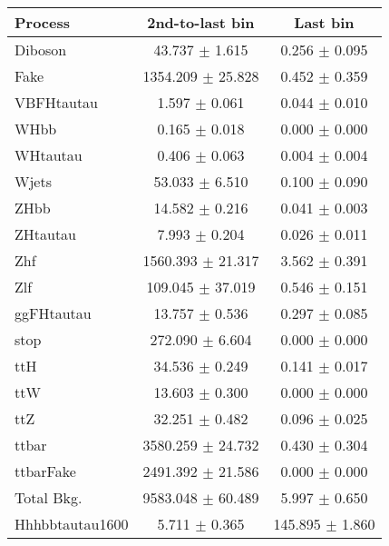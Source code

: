 \begin{tabular}{lcc}
  \toprule
  Process & 2nd-to-last bin & Last bin \\
  \midrule
  Diboson	& 43.737	$\pm$ 1.615	& 0.256	$\pm$ 0.095 \\
  Fake		& 1354.209	$\pm$ 25.828	& 0.452	$\pm$ 0.359 \\
  VBFHtautau	& 1.597	$\pm$ 0.061	& 0.044	$\pm$ 0.010 \\
  WHbb		& 0.165	$\pm$ 0.018	& 0.000	$\pm$ 0.000 \\
  WHtautau	& 0.406	$\pm$ 0.063	& 0.004	$\pm$ 0.004 \\
  Wjets		& 53.033	$\pm$ 6.510	& 0.100	$\pm$ 0.090 \\
  ZHbb		& 14.582	$\pm$ 0.216	& 0.041	$\pm$ 0.003 \\
  ZHtautau	& 7.993	$\pm$ 0.204	& 0.026	$\pm$ 0.011 \\
  Zhf		& 1560.393	$\pm$ 21.317	& 3.562	$\pm$ 0.391 \\
  Zlf		& 109.045	$\pm$ 37.019	& 0.546	$\pm$ 0.151 \\
  ggFHtautau	& 13.757	$\pm$ 0.536	& 0.297	$\pm$ 0.085 \\
  stop		& 272.090	$\pm$ 6.604	& 0.000	$\pm$ 0.000 \\
  ttH		& 34.536	$\pm$ 0.249	& 0.141	$\pm$ 0.017 \\
  ttW		& 13.603	$\pm$ 0.300	& 0.000	$\pm$ 0.000 \\
  ttZ		& 32.251	$\pm$ 0.482	& 0.096	$\pm$ 0.025 \\
  ttbar		& 3580.259	$\pm$ 24.732	& 0.430	$\pm$ 0.304 \\
  ttbarFake	& 2491.392	$\pm$ 21.586	& 0.000	$\pm$ 0.000 \\
  \midrule
  Total Bkg.    & 9583.048	$\pm$ 60.489	& 5.997	$\pm$ 0.650 \\
  \midrule
  Hhhbbtautau1600	& 5.711	$\pm$ 0.365	& 145.895	$\pm$ 1.860 \\
  \bottomrule
\end{tabular}
